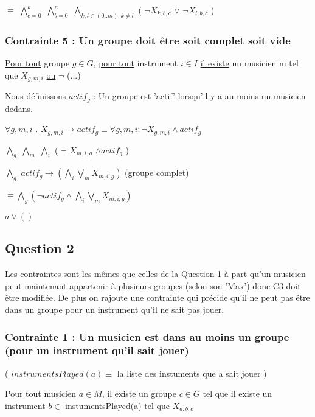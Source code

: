 \documentclass[a4paper,10pt]{article}
\begin{document}
$\equiv$ $\bigwedge \limits_{c=0}^{k}$ $\bigwedge \limits_{b=0}^{n}$  $\bigwedge \limits_{k,l \in (0..m); k\neq l}$ ( $\neg X_{k,b,c}$ $\vee $ $ \neg X_{l,b,c}$ ) 
 
 
\subsubsection{Contrainte 5 : Un groupe doit être soit complet soit vide} 
 
\underline{Pour tout} groupe $g \in G$, \underline{pour tout} instrument $i \in I$ \underline{il existe} un musicien m tel que $X_{g,m,i}$  \underline{ou} $\neg$ (...)


Nous définissons $actif_g$ : Un groupe est 'actif' lorsqu'il y a au moins un musicien dedans.

$\forall g,m,i$ . $X_{g,m,i} \rightarrow actif_g \equiv \forall g,m,i : \neg X_{g,m,i} \wedge actif_g$

$\bigwedge \limits_{g}$ $\bigwedge \limits_{m}$ $\bigwedge \limits_{i}$ ( $\neg$ $X_{m,i,g}$ $\wedge actif_g $ )
 
$\bigwedge \limits_{g}$ $actif_g \rightarrow (\bigwedge \limits_{i} \bigvee \limits_{m} X_{m,i,g})$  (groupe complet)

$\equiv \bigwedge \limits_{g} ( \neg actif_g \wedge \bigwedge \limits_{i} \bigvee \limits_{m} X_{m,i,g}) $

$ a \vee () $
 
 
\subsection{Question 2}

Les contraintes sont les mêmes que celles de la Question 1 à part qu'un musicien peut maintenant appartenir à plusieurs groupes (selon son 'Max') donc C3 doit être modifiée.
De plus on rajoute une contrainte qui précide qu'il ne peut pas être dans un groupe pour un instrument qu'il ne sait pas jouer.
 
 
\subsubsection{Contrainte 1 : Un musicien est dans au moins un groupe (pour un instrument qu'il sait jouer)}


( $instrumentsPlayed(a) \equiv$ la liste des instuments que a sait jouer )


\underline{Pour tout} musicien $a \in M $, \underline{il existe} un groupe $c \in G$ tel que \underline{il existe} un instrument $b \in$ instumentsPlayed(a)  tel que $X_{a,b,c}$
\end{document}

